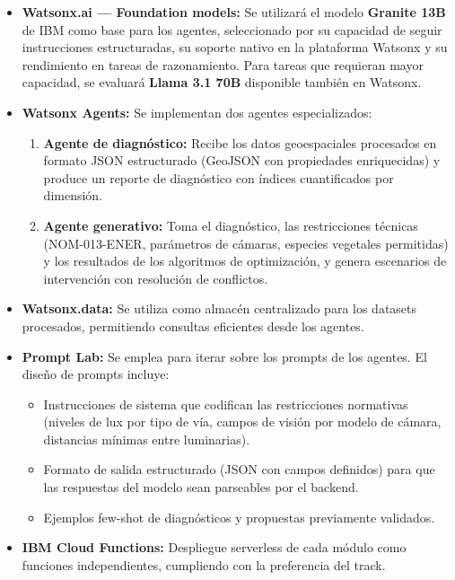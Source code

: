 \documentclass[12pt,a4paper]{article}
\begin{document}
\begin{itemize}[leftmargin=1.5cm]
    \item \textbf{Watsonx.ai — Foundation models:} Se utilizará el modelo \textbf{Granite 13B} de IBM como base para los agentes, seleccionado por su capacidad de seguir instrucciones estructuradas, su soporte nativo en la plataforma Watsonx y su rendimiento en tareas de razonamiento. Para tareas que requieran mayor capacidad, se evaluará \textbf{Llama 3.1 70B} disponible también en Watsonx.
    
    \item \textbf{Watsonx Agents:} Se implementan dos agentes especializados:
    \begin{enumerate}[label=(\arabic*)]
        \item \textbf{Agente de diagnóstico:} Recibe los datos geoespaciales procesados en formato JSON estructurado (GeoJSON con propiedades enriquecidas) y produce un reporte de diagnóstico con índices cuantificados por dimensión.
        \item \textbf{Agente generativo:} Toma el diagnóstico, las restricciones técnicas (NOM-013-ENER, parámetros de cámaras, especies vegetales permitidas) y los resultados de los algoritmos de optimización, y genera escenarios de intervención con resolución de conflictos.
    \end{enumerate}
    
    \item \textbf{Watsonx.data:} Se utiliza como almacén centralizado para los datasets procesados, permitiendo consultas eficientes desde los agentes.
    
    \item \textbf{Prompt Lab:} Se emplea para iterar sobre los prompts de los agentes. El diseño de prompts incluye:
    \begin{itemize}[leftmargin=0.5cm]
        \item Instrucciones de sistema que codifican las restricciones normativas (niveles de lux por tipo de vía, campos de visión por modelo de cámara, distancias mínimas entre luminarias).
        \item Formato de salida estructurado (JSON con campos definidos) para que las respuestas del modelo sean parseables por el backend.
        \item Ejemplos few-shot de diagnósticos y propuestas previamente validados.
    \end{itemize}
    
    \item \textbf{IBM Cloud Functions:} Despliegue serverless de cada módulo como funciones independientes, cumpliendo con la preferencia del track.
\end{itemize}
\end{document}
